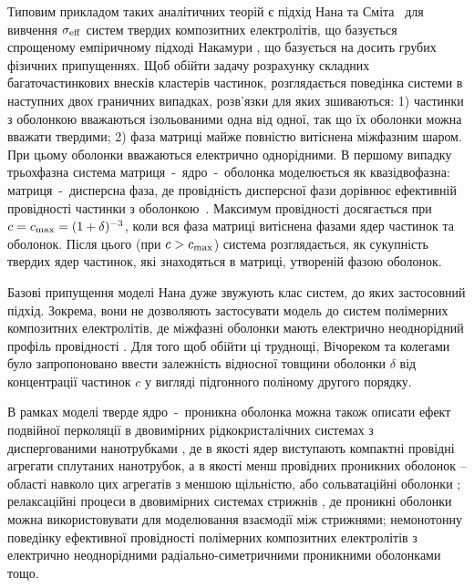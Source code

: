 \documentclass[14pt,twoside]{vakthesis}
\begin{document}
Типовим прикладом таких аналітичних теорій є підхід Нана та Сміта~\cite{Nan1987, NanC.-W.1991, Nan1993} для вивчення $\sigma_{\rm eff}$ систем твердих композитних електролітів, що базується спрощеному емпіричному підході Накамури \cite{Nakamura1984}, що базується на досить грубих фізичних припущеннях.
Щоб обійти задачу розрахунку складних багаточастинкових внесків кластерів частинок, розглядається поведінка системи в наступних двох граничних випадках, розв'язки для яких зшиваються: 1) частинки з оболонкою вважаються ізольованими одна від одної, так що їх оболонки можна вважати твердими; 2) фаза матриці майже повністю витіснена міжфазним шаром. При цьому оболонки вважаються електрично однорідними. 
В першому випадку трьохфазна система матриця~-~ядро~-~оболонка моделюється як квазідвофазна: матриця~-~дисперсна фаза, де провідність дисперсної фази дорівнює ефективній провідності частинки з оболонкою~\cite{Maxwell1892, Brailsford1986, Chettiar2012}.
Максимум провідності досягається при  $c = c_{\rm max} = (1+\delta)^{-3}$, коли вся фаза матриці витіснена фазами ядер частинок та оболонок. 
Після цього (при $c > c_{\rm max}$) система розглядається, як сукупність твердих ядер частинок, які знаходяться в матриці, утвореній фазою оболонок. 

Базові припущення моделі Нана
дуже звужують клас систем, до яких застосовний підхід.
Зокрема, вони не дозволяють застосувати модель до систем полімерних композитних електролітів, де міжфазні оболонки мають електрично неоднорідний профіль провідності \cite{nanocomp2008}.
Для того щоб обійти ці труднощі, Вічореком та колегами~\cite{Wiec1989,Wiec1994,Przl1995} було запропоновано    ввести залежність відносної товщини оболонки $\delta$ від концентрації частинок $c$ у вигляді підгонного поліному другого порядку. 

В рамках моделі тверде ядро~-~проникна оболонка можна також описати ефект подвійної перколяції в двовимірних рідкокристалічних системах з диспергованими нанотрубками \cite{Tomylko2015, Lebovka2017}, де в якості ядер виступають компактні провідні агрегати сплутаних нанотрубок, а в якості  менш провідних проникних оболонок -- області навколо цих агрегатів з меншою щільністю, або сольватаційні оболонки \cite{Lebovka2017}; релаксаційні процеси в двовимірних системах стрижнів \cite{Lebovka2019}, де проникні оболонки можна використовувати для моделювання взаємодії між стрижнями; немонотонну поведінку ефективної провідності полімерних композитних електролітів з електрично неоднорідними радіально-симетричними проникними оболонками \cite{nanocomp2008} тощо. 
\end{document}
